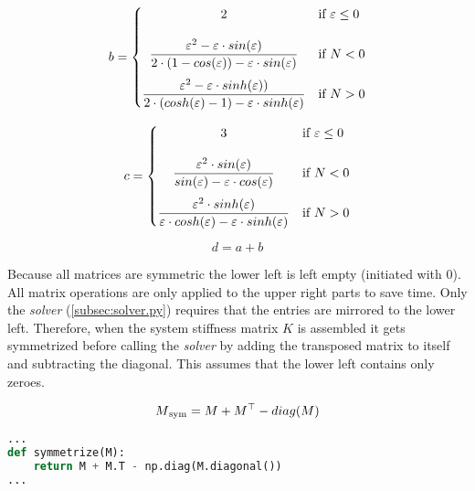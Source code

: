 \begin{equation} \label{b}
    b = \begin{cases}
            \hfil 2              & \text{if } \varepsilon \leq 0\\[1.2em]
            \hfil \dfrac{\varepsilon^2 - \varepsilon \cdot sin(\varepsilon)}{2\cdot(1 - cos(\varepsilon)) - \varepsilon \cdot sin(\varepsilon) }               & \text{if } N < 0          \\[1.2em]
            \dfrac{\varepsilon^2 - \varepsilon \cdot sinh(\varepsilon))}{2 \cdot (cosh(\varepsilon) - 1) - \varepsilon \cdot sinh(\varepsilon)}               & \text{if } N > 0
        \end{cases}
\end{equation}

\begin{equation} \label{c}
    c = \begin{cases}
            \hfil 3              & \text{if } \varepsilon \leq 0\\[1.2em]
            \hfil \dfrac{\varepsilon^2 \cdot sin(\varepsilon)}{sin(\varepsilon) - \varepsilon \cdot cos(\varepsilon)}               & \text{if } N < 0          \\[1.2em]
            \dfrac{\varepsilon^2 \cdot sinh(\varepsilon)}{\varepsilon \cdot cosh(\varepsilon) - \varepsilon \cdot sinh(\varepsilon)}               & \text{if } N > 0
        \end{cases}
\end{equation}

\begin{equation} \label{d}
    d = a + b
\end{equation}

Because all matrices are symmetric the lower left is left empty (initiated with $0$). All matrix operations are only applied to the upper right parts to save time.
Only the \textit{solver} (\cref{subsec:solver.py}) requires that the entries are mirrored to the lower left. Therefore, when the system stiffness matrix $K$ is assembled it gets symmetrized before calling the \textit{solver} by adding the transposed matrix to itself and subtracting the diagonal.
This assumes that the lower left contains only zeroes.

\begin{equation} \label{symmetrize}
    M\textsubscript{sym} = M + M^\top - diag(M)
\end{equation}


\begin{inconsolata}
\begin{minipage}{\linewidth}
\begin{lstlisting}[language=python]
...
def symmetrize(M):
    return M + M.T - np.diag(M.diagonal())
...
\end{lstlisting}
\end{minipage}
\end{inconsolata}

